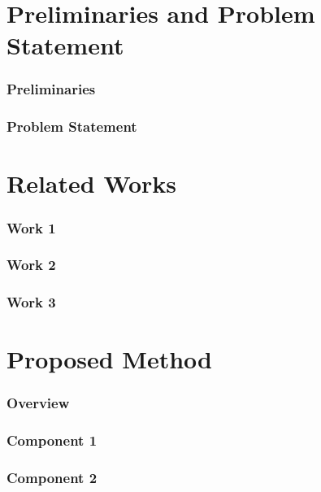\documentclass[aspectratio=169]{beamer}
\begin{document}
	\section{Preliminaries and Problem Statement}
	\begin{frame}
		\frametitle{Preliminaries}
		
	\end{frame}
	
	\begin{frame}
		\frametitle{Problem Statement}
		
	\end{frame}
	
	\section{Related Works}
	\begin{frame}
		\frametitle{Work 1}
		
	\end{frame}
	
	\begin{frame}
		\frametitle{Work 2}
		
	\end{frame}
	
	\begin{frame}
		\frametitle{Work 3}
		
	\end{frame}
	
	\section{Proposed Method}
	
	\begin{frame}
		\frametitle{Overview}
		
	\end{frame}
	
	
	\begin{frame}
		\frametitle{Component 1}
		
	\end{frame}
	
	\begin{frame}
		\frametitle{Component 2}
		
	\end{frame}
	
\end{document}
